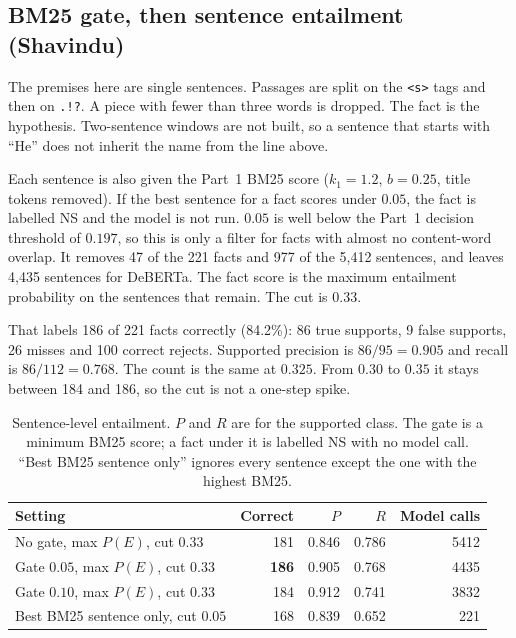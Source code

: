 \documentclass[12pt,a4paper]{article}
\begin{document}
\subsection{BM25 gate, then sentence entailment (Shavindu)}
\label{sec:p2shavindu}
The premises here are single sentences. Passages are split on the \texttt{<s>} tags and then on \texttt{.!?}. A piece with fewer than three words is dropped. The fact is the hypothesis. Two-sentence windows are not built, so a sentence that starts with ``He'' does not inherit the name from the line above.

Each sentence is also given the Part~1 BM25 score ($k_1 = 1.2$, $b = 0.25$, title tokens removed). If the best sentence for a fact scores under $0.05$, the fact is labelled NS and the model is not run. $0.05$ is well below the Part~1 decision threshold of $0.197$, so this is only a filter for facts with almost no content-word overlap. It removes 47 of the 221 facts and 977 of the 5{,}412 sentences, and leaves 4{,}435 sentences for DeBERTa. The fact score is the maximum entailment probability on the sentences that remain. The cut is $0.33$.

That labels 186 of 221 facts correctly (84.2\%): 86 true supports, 9 false supports, 26 misses and 100 correct rejects. Supported precision is $86/95 = 0.905$ and recall is $86/112 = 0.768$. The count is the same at $0.325$. From $0.30$ to $0.35$ it stays between 184 and 186, so the cut is not a one-step spike.

\begin{table}[H]
\centering
\small
\begin{tabular}{lrrrr}
\toprule
Setting & Correct & $P$ & $R$ & Model calls \\
\midrule
No gate, max $P(E)$, cut $0.33$ & 181 & 0.846 & 0.786 & 5412 \\
Gate $0.05$, max $P(E)$, cut $0.33$ & \textbf{186} & 0.905 & 0.768 & 4435 \\
Gate $0.10$, max $P(E)$, cut $0.33$ & 184 & 0.912 & 0.741 & 3832 \\
Best BM25 sentence only, cut $0.05$ & 168 & 0.839 & 0.652 & 221 \\
\bottomrule
\end{tabular}
\caption{Sentence-level entailment. $P$ and $R$ are for the supported class. The gate is a minimum BM25 score; a fact under it is labelled NS with no model call. ``Best BM25 sentence only'' ignores every sentence except the one with the highest BM25.}
\label{tab:shavindu-p2}
\end{table}
\end{document}
